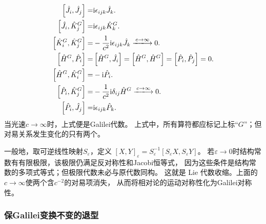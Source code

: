 \begin{subequations}
    \begin{align}
        \left[\hat{J}_i, \hat{J}_j \right] =& \i \epsilon_{ijk} \hat{J}_k . \\
        \left[\hat{J}_i, \hat{K}_j^G\right] =& \i \epsilon_{ijk} \hat{K}_k ^G. \\
        \left[\hat{K}_i^G, \hat{K}_j^G\right] =& -\frac{1}{c^2}\i \epsilon_{ijk} \hat{J}_k
        \xlongrightarrow{c\to \infty} 0. \\
        \left[\hat{H}^G, \hat{P}_i \right] =& \left[\hat{H}^G, \hat{J}_i \right]
        =\left[\hat{H}^G, \hat{H}^G \right] =\left[\hat{P}_i, \hat{P}_j \right] =0 . \\
        \left[\hat{H}^G, \hat{K}^G_i \right] = & -\i \hat{P}_i .\\
        \left[\hat{P}_i, \hat{K}^G_j \right] =& -\frac{1}{c^2}\i \delta_{ij} \hat{H}^G
        \xlongrightarrow{c\to \infty} 0.\\
        \left[\hat{P}_i, \hat{J}_j \right] =& \i \epsilon_{ijk} \hat{P}_k .
    \end{align}
\end{subequations}
当光速$c\to \infty$时，上式便是Galilei代数。
上式中，所有算符都应标记上标“$G$”；但对易关系发生变化的只有两个。

一般地，取可逆线性映射$S_\varepsilon$，定义
$[X,Y]_\varepsilon=S_\varepsilon^{-1}[S_\varepsilon X,S_\varepsilon Y]$。
若$\varepsilon\to0$时结构常数有有限极限，该极限仍满足反对称性和Jacobi恒等式，
因为这些条件是结构常数的多项式等式；但极限代数未必与原代数同构。
这就是 Lie 代数收缩。上面的$c\to\infty$使两个含$c^{-2}$的对易项消失，
从而将相对论的运动对称性化为Galilei对称性。

\subsubsection{保Galilei变换不变的退型}

